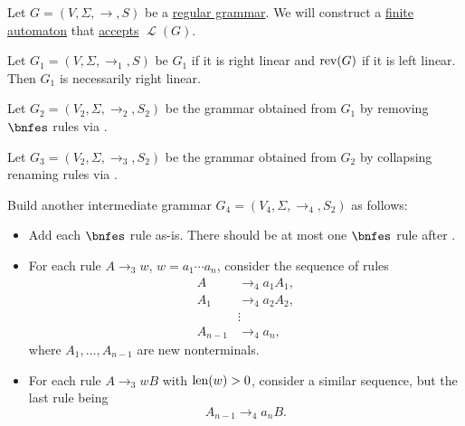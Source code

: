 \begin{algorithm}\label{alg:regular_grammar_to_automaton}
  Let \( G = (V, \Sigma, \to, S) \) be a \hyperref[def:chomsky_hierarchy/regular]{regular grammar}. We will construct a \hyperref[def:finite_automaton]{finite automaton} that \hyperref[def:finite_automaton/language]{accepts} \( \mscrL(G) \).

  \begin{thmenum}
     Let \( G_1 = (V, \Sigma, \to_1, S) \) be \( G_1 \) if it is right linear and \( \op{rev}(G) \) if it is left linear. Then \( G_1 \) is necessarily right linear.

     Let \( G_2 = (V_2, \Sigma, \to_2, S_2) \) be the grammar obtained from \( G_1 \) by removing \( \bnfes \) rules via .

     Let \( G_3 = (V_2, \Sigma, \to_3, S_2) \) be the grammar obtained from \( G_2 \) by collapsing renaming rules via .

     Build another intermediate grammar \( G_4 = (V_4, \Sigma, \to_4, S_2) \) as follows:
    \begin{itemize}
      \item Add each \( \bnfes \) rule as-is. There should be at most one \( \bnfes \) rule after .
      \item For each rule \( A \to_3 w \), \( w = a_1 \cdots a_n \), consider the sequence of rules
      \begin{align*}
        A       &\to_4 a_1 A_1, \\
        A_1     &\to_4 a_2 A_2, \\
                &\vdots \\
        A_{n-1} &\to_4 a_n,
      \end{align*}
      where \( A_1, \ldots, A_{n-1} \) are new nonterminals.

      \item For each rule \( A \to_3 wB \) with \( \operatorname{len}(w) > 0 \), consider a similar sequence, but the last rule being
      \begin{equation*}
        A_{n-1} \to_4 a_n B.
      \end{equation*}
    \end{itemize}


\end{thmenum}
\end{algorithm}
